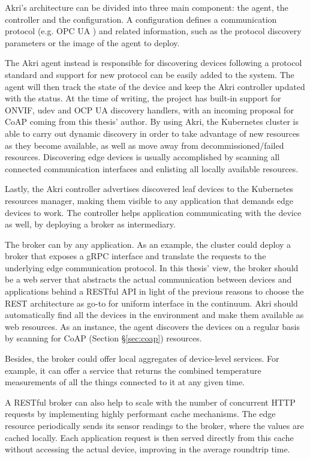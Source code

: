 \documentclass{ieeeaccess}
\begin{document}
Akri's architecture can be divided into three main component: the agent, the controller and the configuration. A configuration defines a communication protocol (e.g. OPC UA \cite{rest-opc}) and related information, such as the protocol discovery parameters or the image of the agent to deploy.

The Akri agent instead is responsible for discovering devices following a protocol standard and support for new protocol can be easily added to the system. The agent will then track the state of the device and keep the Akri controller updated with the status. At the time of writing, the project has built-in support for ONVIF, udev and OCP UA \cite{rest-opc} discovery handlers, with an incoming proposal for CoAP \cite{coap} coming from this thesis' author. By using Akri, the Kubernetes cluster is able to carry out dynamic discovery in order to take advantage of new resources as they become available, as well as move away from decommissioned/failed resources. Discovering edge devices is usually accomplished by scanning all connected communication interfaces and enlisting all locally available resources.

Lastly, the Akri controller advertises discovered leaf devices to the Kubernetes resources manager, making them visible to any application that demands edge devices to work. The controller helps application communicating with the device as well, by deploying a broker as intermediary. 

The broker can by any application. As an example, the cluster could deploy a broker that exposes a gRPC \cite{gRPC} interface and translate the requests to the underlying edge communication protocol. In this thesis' view, the broker should be a web server that abstracts the actual communication between devices and applications behind a RESTful API in light of the previous reasons to choose the REST architecture as go-to for uniform interface in the continuum. Akri should automatically find all the devices in the environment and make them available as web resources. As an instance, the agent discovers the devices on a regular basis by scanning for CoAP (Section §\ref{sec:coap}) resources.

Besides, the broker could offer local aggregates of device-level services. For example, it can offer a service that returns the combined temperature measurements of all the things connected to it at any given time.

A RESTful broker can also help to scale with the number of concurrent HTTP requests by implementing highly performant cache mechanisms. The edge resource periodically sends its sensor readings to the broker, where the values are cached locally. Each application request is then served directly from this cache without accessing the actual device, improving in the average roundtrip time.
\end{document}
